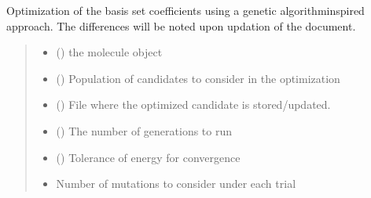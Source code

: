 \documentclass[letterpaper,10pt,english]{sphinxmanual}
\begin{document}
\begin{fulllineitems}
\label{\detokenize{api:MSTOOpt.OptimizeElement}}
\pysigstartsignatures
\pysiglinewithargsret
{}
{\sphinxparamcomma {}\sphinxparamcomma {}\sphinxparamcomma {}\sphinxparamcomma {}\sphinxparamcomma {}\sphinxparamcomma {}}
{}
\pysigstopsignatures
\sphinxAtStartPar
Optimization of the basis set coefficients using a genetic algorithm\sphinxhyphen{}inspired approach. The differences will be noted upon updation of the document.
\begin{quote}\begin{description}
\begin{itemize}
\item {} 
\sphinxAtStartPar
{} () \textendash{} the  molecule object

\item {} 
\sphinxAtStartPar
{} () \textendash{} Population of candidates to consider in the optimization

\item {} 
\sphinxAtStartPar
{} () \textendash{} File where the optimized candidate is stored/updated.

\item {} 
\sphinxAtStartPar
{} () \textendash{} The number of generations to run

\item {} 
\sphinxAtStartPar
{} () \textendash{} Tolerance of energy for convergence

\item {} 
\sphinxAtStartPar
{} \textendash{} Number of mutations to consider under each trial


\end{itemize}
\end{description}
\end{quote}
\end{fulllineitems}
\end{document}

